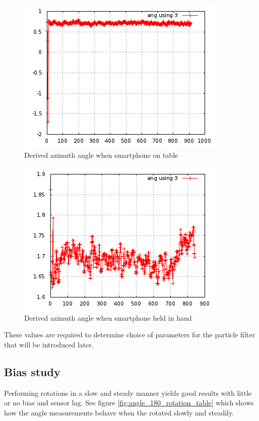 \begin{figure}\centering
    \includegraphics{figures/angle_stationary_table.png}
    \caption{Derived azimuth angle when smartphone on table}
\end{figure}

\begin{figure}\centering
    \includegraphics{figures/angle_handheld_standing.png}
    \caption{Derived azimuth angle when smartphone held in hand}
\end{figure}



These values are required to determine choice of parameters for the particle
filter that will be introduced later.

\subsection{Bias study}

Performing rotations in a slow and steady manner yields good results with little
or no bias and sensor lag. See figure \ref{fig:angle_180_rotation_table} which 
shows how the angle measurements behave when the rotated slowly and steadily.


